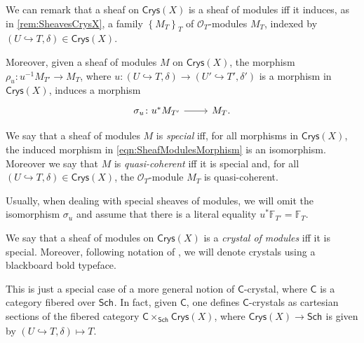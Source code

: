 \begin{rem}[]
	We can remark that a sheaf on $\mathsf{Crys}(X)$ is a sheaf of modules
	iff it induces, as in \cref{rem:SheavesCrysX}, a
	family $\left\{ M_T \right\}_{T}$ of $\mathcal{O}_{ T }$-modules $M_T$, 
	indexed by $\left(U \hookrightarrow T, \delta\right) \in \mathsf{Crys}(X)$.

	Moreover, given a sheaf of modules $M$ on $\mathsf{Crys}(X)$,
	the morphism $\rho_u\colon u^{-1}M_{T'} \to M_T$,
	where $u\colon \left(U \hookrightarrow T, \delta\right) \to
	\left(U' \hookrightarrow T', \delta'\right)$
	is a morphism in $\mathsf{Crys}(X)$, induces a morphism
	\begin{equation}\label{eqn:SheafModulesMorphism}
	\begin{tikzcd}[row sep = 0ex
		,/tikz/column 1/.append style={anchor=base east}
		,/tikz/column 2/.append style={anchor=base west}]
		\sigma_u\colon 
		u^* M_{T'}\arrow[r, "", rightarrow] &
		M_T
	.\end{tikzcd}
	\end{equation} 	
\end{rem}


\begin{defn}[]\label{defn:SpecialQCSheavesCrys}
	We say that a sheaf of modules $M$ is {\em special}
	iff, for all morphisms in $\mathsf{Crys}(X)$,
	the induced morphism in \cref{eqn:SheafModulesMorphism}
	is an isomorphism.
	Moreover we say that $M$ is {\em quasi-coherent} iff it is special and, for all
	$\left(U \hookrightarrow T, \delta\right) \in \mathsf{Crys}(X)$, the $\mathcal{O}_{ T }$-module
	$M_T$ is quasi-coherent.
\end{defn}


\begin{rem}[]\label{rem:specialSheavesIso}
	Usually, when dealing with special sheaves of modules, we will omit the isomorphism
	$\sigma_u$ and assume that there is a literal equality
	$u^*\mathbb{F}_{T'} = \mathbb{F}_T$.
\end{rem}


\begin{defn}
	We say that a sheaf of modules on $\mathsf{Crys}(X)$ is 
	a {\em crystal of modules} iff it is special.
	Moreover, following notation of \cite{Messing}, we will
	denote crystals using a blackboard bold typeface.
\end{defn}


\begin{rem}[]
	This is just a special case of a more general notion 
	of $\mathsf{C}$-crystal, where $\mathsf{C}$ is a category fibered over $\mathsf{Sch}_{  }$.
	In fact, given $\mathsf{C}$, one defines $\mathsf{C}$-crystals as cartesian
	sections of the fibered category $\mathsf{C} \times_{ \mathsf{Sch}_{  } } \mathsf{Crys}(X)$,
	where $\mathsf{Crys}(X) \to \mathsf{Sch}_{  }$ is given by
	$\left(U \hookrightarrow T, \delta\right) \mapsto T$.
\end{rem}


